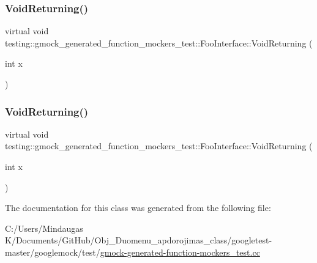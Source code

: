 \subsubsection{\texorpdfstring{VoidReturning()}{VoidReturning()}\hspace{0.1cm}{\footnotesize\ttfamily [2/3]}}
{\footnotesize\ttfamily virtual void testing\+::gmock\+\_\+generated\+\_\+function\+\_\+mockers\+\_\+test\+::\+Foo\+Interface\+::\+Void\+Returning (\begin{DoxyParamCaption}\item[{int}]{x }\end{DoxyParamCaption})\hspace{0.3cm}{\ttfamily [pure virtual]}}

\mbox{\label{classtesting_1_1gmock__generated__function__mockers__test_1_1_foo_interface_adf968115cf1260004d8abe372dc71c85}} 
\subsubsection{\texorpdfstring{VoidReturning()}{VoidReturning()}\hspace{0.1cm}{\footnotesize\ttfamily [3/3]}}
{\footnotesize\ttfamily virtual void testing\+::gmock\+\_\+generated\+\_\+function\+\_\+mockers\+\_\+test\+::\+Foo\+Interface\+::\+Void\+Returning (\begin{DoxyParamCaption}\item[{int}]{x }\end{DoxyParamCaption})\hspace{0.3cm}{\ttfamily [pure virtual]}}



The documentation for this class was generated from the following file\+:\begin{DoxyCompactItemize}
\item 
C\+:/\+Users/\+Mindaugas K/\+Documents/\+Git\+Hub/\+Obj\+\_\+\+Duomenu\+\_\+apdorojimas\+\_\+class/googletest-\/master/googlemock/test/\mbox{\hyperlink{googletest-master_2googlemock_2test_2gmock-generated-function-mockers__test_8cc}{gmock-\/generated-\/function-\/mockers\+\_\+test.\+cc}}\end{DoxyCompactItemize}
